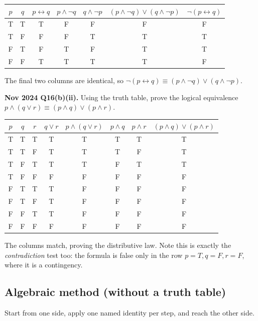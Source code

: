 \documentclass[11pt,a4paper]{article}
\begin{document}
\begin{solbox}
\begin{center}\small
\begin{tabular}{cc|ccc|c|c}
\toprule $p$&$q$&$p\leftrightarrow q$&$p\land\neg q$&$q\land\neg p$&$(p\land\neg q)\lor(q\land\neg p)$&$\neg(p\leftrightarrow q)$\\\midrule
T&T&T&F&F&F&F\\
T&F&F&F&T&T&T\\
F&T&F&T&F&T&T\\
F&F&T&T&T&T&F\\\bottomrule
\end{tabular}
\end{center}
The final two columns are identical, so $\neg(p\leftrightarrow q)\equiv(p\land\neg q)\lor(q\land\neg p)$.
\end{solbox}

\begin{pyqbox}
\textbf{Nov 2024 Q16(b)(ii).} Using the truth table, prove the logical equivalence $p\land(q\lor r)\equiv(p\land q)\lor(p\land r)$.
\end{pyqbox}

\begin{solbox}
\begin{center}\small
\begin{tabular}{ccc|ccccc}
\toprule $p$&$q$&$r$&$q\lor r$&$p\land(q\lor r)$&$p\land q$&$p\land r$&$(p\land q)\lor(p\land r)$\\\midrule
T&T&T&T&T&T&T&T\\
T&T&F&T&T&T&F&T\\
T&F&T&T&T&F&T&T\\
T&F&F&F&F&F&F&F\\
F&T&T&T&F&F&F&F\\
F&T&F&T&F&F&F&F\\
F&F&T&T&F&F&F&F\\
F&F&F&F&F&F&F&F\\\bottomrule
\end{tabular}
\end{center}
The columns match, proving the distributive law. Note this is exactly the \emph{contradiction} test too: the formula is false only in the row $p=T,q=F,r=F$, where it is a contingency.
\end{solbox}

\subsection{Algebraic method (without a truth table)}
Start from one side, apply one named identity per step, and reach the other side.
\end{document}

